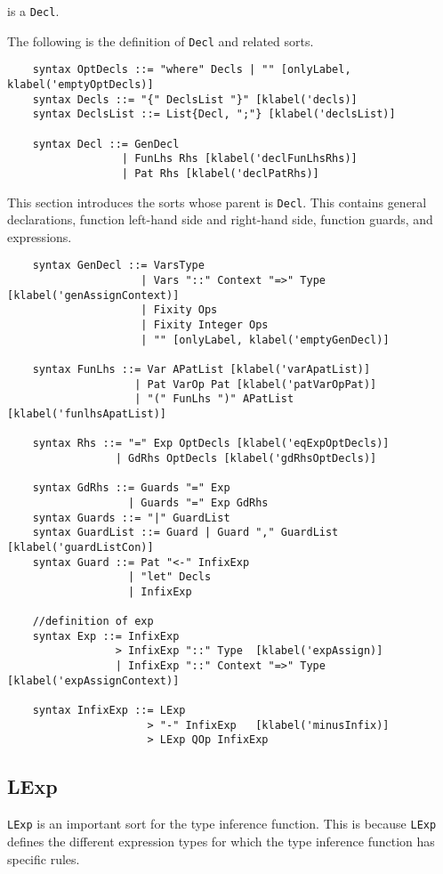 is a \texttt{Decl}.

The following is the definition of \texttt{Decl} and related sorts.

\begin{lstlisting}
    syntax OptDecls ::= "where" Decls | "" [onlyLabel, klabel('emptyOptDecls)]
    syntax Decls ::= "{" DeclsList "}" [klabel('decls)]
    syntax DeclsList ::= List{Decl, ";"} [klabel('declsList)]

    syntax Decl ::= GenDecl
                  | FunLhs Rhs [klabel('declFunLhsRhs)]
                  | Pat Rhs [klabel('declPatRhs)]
\end{lstlisting}

This section introduces the sorts whose parent is \texttt{Decl}. This contains general declarations, function left-hand side and right-hand side, function guards, and expressions.

\begin{lstlisting}
    syntax GenDecl ::= VarsType
                     | Vars "::" Context "=>" Type   [klabel('genAssignContext)]
                     | Fixity Ops
                     | Fixity Integer Ops
                     | "" [onlyLabel, klabel('emptyGenDecl)]

    syntax FunLhs ::= Var APatList [klabel('varApatList)]
                    | Pat VarOp Pat [klabel('patVarOpPat)]
                    | "(" FunLhs ")" APatList [klabel('funlhsApatList)]

    syntax Rhs ::= "=" Exp OptDecls [klabel('eqExpOptDecls)]
                 | GdRhs OptDecls [klabel('gdRhsOptDecls)]

    syntax GdRhs ::= Guards "=" Exp
                   | Guards "=" Exp GdRhs
    syntax Guards ::= "|" GuardList
    syntax GuardList ::= Guard | Guard "," GuardList  [klabel('guardListCon)]
    syntax Guard ::= Pat "<-" InfixExp
                   | "let" Decls
                   | InfixExp

    //definition of exp
    syntax Exp ::= InfixExp
                 > InfixExp "::" Type  [klabel('expAssign)]
                 | InfixExp "::" Context "=>" Type  [klabel('expAssignContext)]

    syntax InfixExp ::= LExp
                      > "-" InfixExp   [klabel('minusInfix)]
                      > LExp QOp InfixExp
\end{lstlisting}

\subsection{LExp}
\texttt{LExp} is an important sort for the type inference function. This is because \texttt{LExp} defines the different expression types for which the type inference function has specific rules.

